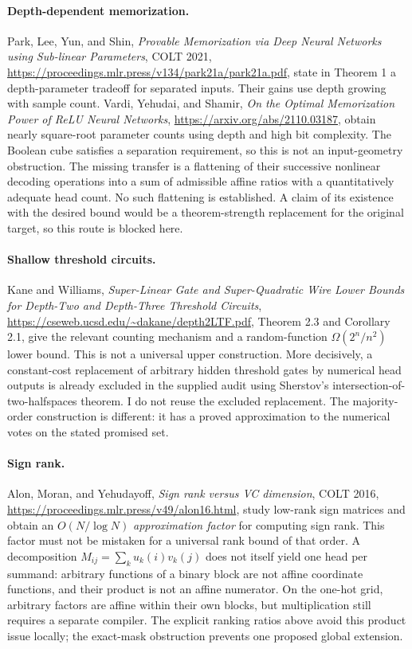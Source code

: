 \documentclass[11pt]{article}
\begin{document}
\paragraph{Depth-dependent memorization.}
Park, Lee, Yun, and Shin, \emph{Provable Memorization via Deep Neural
Networks using Sub-linear Parameters}, COLT 2021,
\url{https://proceedings.mlr.press/v134/park21a/park21a.pdf},
state in Theorem 1 a depth-parameter tradeoff for separated inputs.
Their gains use depth growing with sample count. Vardi, Yehudai,
and Shamir, \emph{On the Optimal Memorization Power of ReLU Neural
Networks}, \url{https://arxiv.org/abs/2110.03187}, obtain nearly
square-root parameter counts using depth and high bit complexity.
The Boolean cube satisfies a separation requirement, so this is not
an input-geometry obstruction. The missing transfer is a flattening
of their successive nonlinear decoding operations into a sum of
admissible affine ratios with a quantitatively adequate head count.
No such flattening is established. A claim of its existence with
the desired bound would be a theorem-strength replacement for the
original target, so this route is blocked here.

\paragraph{Shallow threshold circuits.}
Kane and Williams, \emph{Super-Linear Gate and Super-Quadratic Wire
Lower Bounds for Depth-Two and Depth-Three Threshold Circuits},
\url{https://cseweb.ucsd.edu/~dakane/depth2LTF.pdf},
Theorem 2.3 and Corollary 2.1, give the relevant counting mechanism
and a random-function $\Omega(2^n/n^2)$ lower bound.
This is not a universal upper construction. More decisively, a
constant-cost replacement of arbitrary hidden threshold gates by
numerical head outputs is already excluded in the supplied audit
using Sherstov's intersection-of-two-halfspaces theorem. I do not
reuse the excluded replacement. The majority-order construction is
different: it has a proved approximation to the numerical votes on
the stated promised set.

\paragraph{Sign rank.}
Alon, Moran, and Yehudayoff, \emph{Sign rank versus VC dimension},
COLT 2016, \url{https://proceedings.mlr.press/v49/alon16.html},
study low-rank sign matrices and obtain an $O(N/\log N)$
\emph{approximation factor} for computing sign rank. This factor
must not be mistaken for a universal rank bound of that order.
A decomposition $M_{ij}=\sum_k u_k(i)v_k(j)$ does not itself yield
one head per summand: arbitrary functions of a binary block are not
affine coordinate functions, and their product is not an affine
numerator. On the one-hot grid, arbitrary factors are affine within
their own blocks, but multiplication still requires a separate
compiler. The explicit ranking ratios above avoid this product
issue locally; the exact-mask obstruction prevents one proposed
global extension.
\end{document}
